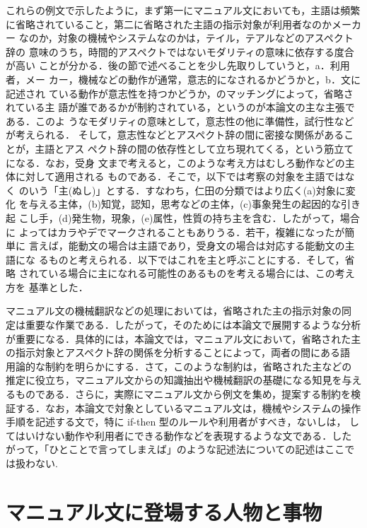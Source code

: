 これらの例文で示したように，まず第一にマニュアル文においても，主語は頻繁
に省略されていること，第二に省略された主語の指示対象が利用者なのかメーカー
なのか，対象の機械やシステムなのかは，テイル，テアルなどのアスペクト辞の
意味のうち，時間的アスペクトではないモダリティの意味に依存する度合が高い
ことが分かる．後の節で述べることを少し先取りしていうと，a．利用者，メー
カー，機械などの動作が通常，意志的になされるかどうかと，b．文に記述され
ている動作が意志性を持つかどうか，のマッチングによって，省略されている主
語が誰であるかが制約されている，というのが本論文の主な主張である．このよ
うなモダリティの意味として，意志性の他に準備性，試行性などが考えられる．
そして，意志性などとアスペクト辞の間に密接な関係があることが，主語とアス
ペクト辞の間の依存性として立ち現れてくる，という筋立てになる．なお，受身
文まで考えると，このような考え方はむしろ動作などの主体に対して適用される
ものである．そこで，以下では考察の対象を主語ではなく
\cite{仁田:日本語の格を求めて}
のいう「主(ぬし)」とする．すなわち，仁田の分類ではより広く(a)対象に変化
を与える主体，(b)知覚，認知，思考などの主体，(c)事象発生の起因的な引き起
こし手，(d)発生物，現象，(e)属性，性質の持ち主を含む．したがって，場合に
よってはカラやデでマークされることもありうる．若干，複雑になったが簡単に
言えば，能動文の場合は主語であり，受身文の場合は対応する能動文の主語にな
るものと考えられる．以下ではこれを{\dg 主}と呼ぶことにする．そして，省略
されている場合に{\dg 主}になれる可能性のあるものを考える場合には、この考え方を
基準とした．

マニュアル文の機械翻訳などの処理においては，省略された{\dg 主}の指示対象の同
定は重要な作業である．したがって，そのためには本論文で展開するような分析
が重要になる．具体的には，本論文では，マニュアル文において，省略された{\dg 主}
の指示対象とアスペクト辞の関係を分析することによって，両者の間にある語
用論的な制約を明らかにする．さて，このような制約は，省略された{\dg 主}などの
推定に役立ち，マニュアル文からの知識抽出や機械翻訳の基礎になる知見を与え
るものである．さらに，実際にマニュアル文から例文を集め，提案する制約を検
証する．なお，本論文で対象としているマニュアル文は，機械やシステムの操作
手順を記述する文で，特に if-then 型のルールや利用者がすべき，ないしは，
してはいけない動作や利用者にできる動作などを表現するような文である．した
がって，「ひとことで言ってしまえば」のような記述法についての記述はここで
は扱わない.


\section{マニュアル文に登場する人物と事物}

